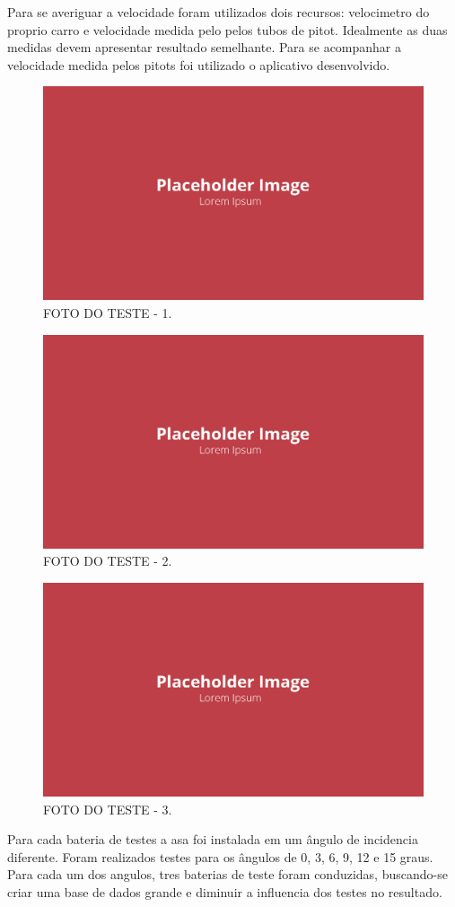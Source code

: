 Para se averiguar a velocidade foram utilizados dois recursos: velocimetro do proprio carro e velocidade medida pelo pelos tubos de pitot. Idealmente as duas medidas devem apresentar resultado semelhante. Para se acompanhar a velocidade medida pelos pitots foi utilizado o aplicativo desenvolvido.

\begin{figure}[!ht]
    \centering
    \includegraphics[width=.8\linewidth]{figuras/placeholder.png}
    \caption{FOTO DO TESTE - 1\cite{autor}.}
    \label{fig:placeholder}
\end{figure}

\begin{figure}[!ht]
    \centering
    \includegraphics[width=.8\linewidth]{figuras/placeholder.png}
    \caption{FOTO DO TESTE - 2\cite{autor}.}
    \label{fig:placeholder}
\end{figure}

\begin{figure}[!ht]
    \centering
    \includegraphics[width=.8\linewidth]{figuras/placeholder.png}
    \caption{FOTO DO TESTE - 3\cite{autor}.}
    \label{fig:placeholder}
\end{figure}

Para cada bateria de testes a asa foi instalada em um ângulo de incidencia diferente. Foram realizados testes para os ângulos de 0, 3, 6, 9, 12 e 15 graus. Para cada um dos angulos, tres baterias de teste foram conduzidas, buscando-se criar uma base de dados grande e diminuir a influencia dos testes no resultado.

